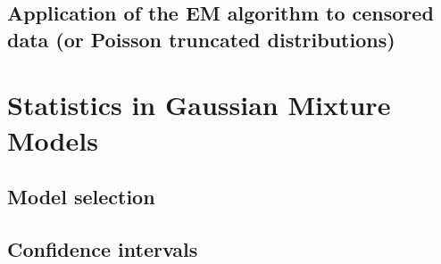 \subsection{Application of the EM algorithm to censored data (or Poisson truncated distributions)}


\section{Statistics in Gaussian Mixture Models}

\subsection{Model selection}
\subsection{Confidence intervals}









